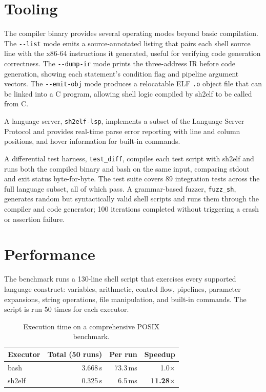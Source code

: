 \documentclass[10pt,twocolumn]{article}
\begin{document}
\section{Tooling}

The compiler binary provides several operating modes beyond basic
compilation. The \texttt{{-}{-}list} mode emits a source-annotated
listing that pairs each shell source line with the x86-64 instructions
it generated, useful for verifying code generation correctness. The
\texttt{{-}{-}dump-ir} mode prints the three-address IR before code
generation, showing each statement's condition flag and pipeline
argument vectors. The \texttt{{-}{-}emit-obj} mode produces a
relocatable ELF \texttt{.o} object file that can be linked into a C
program, allowing shell logic compiled by sh2elf to be called from C.

A language server, \texttt{sh2elf-lsp}, implements a subset of the
Language Server Protocol and provides real-time parse error reporting
with line and column positions, and hover information for built-in
commands.

A differential test harness, \texttt{test\_diff}, compiles each test
script with sh2elf and runs both the compiled binary and bash on the
same input, comparing stdout and exit status byte-for-byte. The test
suite covers 89 integration tests across the full language subset, all
of which pass. A grammar-based fuzzer, \texttt{fuzz\_sh}, generates
random but syntactically valid shell scripts and runs them through the
compiler and code generator; 100 iterations completed without
triggering a crash or assertion failure.


\section{Performance}

The benchmark runs a 130-line shell script that exercises every
supported language construct: variables, arithmetic, control flow,
pipelines, parameter expansions, string operations, file manipulation,
and built-in commands. The script is run 50 times for each executor.

\begin{table}[h]
\centering
\small
\setlength{\tabcolsep}{8pt}
\begin{tabular}{lrrr}
\toprule
Executor & Total (50 runs) & Per run & Speedup \\
\midrule
bash     & 3.668\,s & 73.3\,ms & 1.0$\times$ \\
sh2elf   & 0.325\,s &  6.5\,ms & \textbf{11.28$\times$} \\
\bottomrule
\end{tabular}
\caption{Execution time on a comprehensive POSIX benchmark.}
\end{table}
\end{document}
